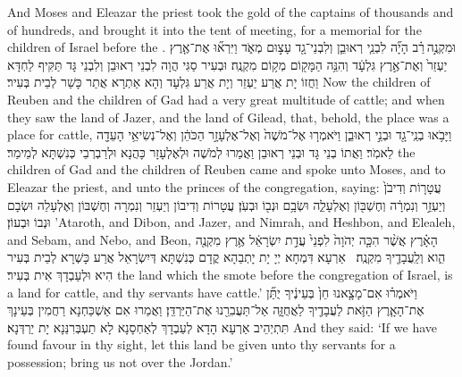{And Moses and Eleazar the priest took the gold of the captains of thousands and of hundreds, and brought it into the tent of meeting, for a memorial for the children of Israel before the \lord.}{}
\newperek
{}%
{וּמִקְנֶ֣ה \legarmeh  רַ֗ב הָיָ֞ה לִבְנֵ֧י רְאוּבֵ֛ן וְלִבְנֵי־גָ֖ד עָצ֣וּם מְאֹ֑ד וַיִּרְא֞וּ אֶת־אֶ֤רֶץ יַעְזֵר֙ וְאֶת־אֶ֣רֶץ גִּלְעָ֔ד וְהִנֵּ֥ה הַמָּק֖וֹם מְק֥וֹם מִקְנֶֽה׃}
{וּבְעִיר סַגִּי הֲוָה לִבְנֵי רְאוּבֵן וְלִבְנֵי גָּד תַּקִּיף לַחְדָּא וַחֲזוֹ יָת אֲרַע יַעְזֵר וְיָת אֲרַע גִּלְעָד וְהָא אַתְרָא אֲתַר כָּשַׁר לְבֵית בְּעִיר׃}
{Now the children of Reuben and the children of Gad had a very great multitude of cattle; and when they saw the land of Jazer, and the land of Gilead, that, behold, the place was a place for cattle,}{}
{וַיָּבֹ֥אוּ בְנֵֽי־גָ֖ד וּבְנֵ֣י רְאוּבֵ֑ן וַיֹּאמְר֤וּ אֶל־מֹשֶׁה֙ וְאֶל־אֶלְעָזָ֣ר הַכֹּהֵ֔ן וְאֶל־נְשִׂיאֵ֥י הָעֵדָ֖ה לֵאמֹֽר׃}
{וַאֲתוֹ בְנֵי גָּד וּבְנֵי רְאוּבֵן וַאֲמַרוּ לְמֹשֶׁה וּלְאֶלְעָזָר כָּהֲנָא וּלְרַבְרְבֵי כְּנִשְׁתָּא לְמֵימַר׃}
{the children of Gad and the children of Reuben came and spoke unto Moses, and to Eleazar the priest, and unto the princes of the congregation, saying:}{}
{עֲטָר֤וֹת וְדִיבֹן֙ וְיַעְזֵ֣ר וְנִמְרָ֔ה וְחֶשְׁבּ֖וֹן וְאֶלְעָלֵ֑ה וּשְׂבָ֥ם וּנְב֖וֹ וּבְעֹֽן׃
}
{עֲטָרוֹת וְדִיבוֹן וְיַעְזֵר וְנִמְרָה וְחֶשְׁבּוֹן וְאֶלְעָלֵה וּשְׂבָם וּנְבוֹ וּבְעוֹן׃}
{’Ataroth, and Dibon, and Jazer, and Nimrah, and Heshbon, and Elealeh, and Sebam, and Nebo, and Beon,}{}
{הָאָ֗רֶץ אֲשֶׁ֨ר הִכָּ֤ה יְהֹוָה֙ לִפְנֵי֙ עֲדַ֣ת יִשְׂרָאֵ֔ל אֶ֥רֶץ מִקְנֶ֖ה הִ֑וא וְלַֽעֲבָדֶ֖יךָ מִקְנֶֽה׃ \setuma }
{אַרְעָא דִּמְחָא יְיָ יָת יָתְבַהָא קֳדָם כְּנִשְׁתָּא דְּיִשְׂרָאֵל אֲרַע כָּשְׁרָא לְבֵית בְּעִיר הִיא וּלְעַבְדָךְ אִית בְּעִיר׃}
{the land which the \lord\space smote before the congregation of Israel, is a land for cattle, and thy servants have cattle.’}{}
{וַיֹּאמְר֗וּ אִם־מָצָ֤אנוּ חֵן֙ בְּעֵינֶ֔יךָ יֻתַּ֞ן אֶת־הָאָ֧רֶץ הַזֹּ֛את לַעֲבָדֶ֖יךָ לַאֲחֻזָּ֑ה אַל־תַּעֲבִרֵ֖נוּ אֶת־הַיַּרְדֵּֽן׃}
{וַאֲמַרוּ אִם אַשְׁכַּחְנָא רַחֲמִין בְּעֵינָךְ תִּתְיְהֵיב אַרְעָא הָדָא לְעַבְדָךְ לְאַחְסָנָא לָא תַעְבְּרִנַּנָא יָת יַרְדְּנָא׃}
{And they said: ‘If we have found favour in thy sight, let this land be given unto thy servants for a possession; bring us not over the Jordan.’}{}
